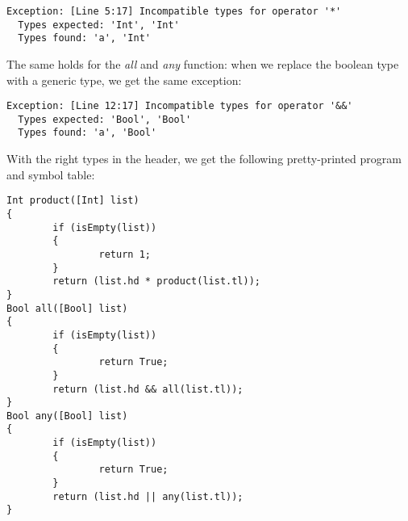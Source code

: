 \documentclass[a4paper]{article}
\begin{document}
\begin{verbatim}
Exception: [Line 5:17] Incompatible types for operator '*'
  Types expected: 'Int', 'Int'
  Types found: 'a', 'Int'
\end{verbatim}
The same holds for the \emph{all} and \emph{any} function: when we replace the boolean type with a generic type, we get the same exception: 
\begin{verbatim}
Exception: [Line 12:17] Incompatible types for operator '&&'
  Types expected: 'Bool', 'Bool'
  Types found: 'a', 'Bool'
\end{verbatim}
With the right types in the header, we get the following pretty-printed program and symbol table:
\begin{verbatim}
Int product([Int] list)
{
        if (isEmpty(list))
        {
                return 1;
        }
        return (list.hd * product(list.tl));
}
Bool all([Bool] list)
{
        if (isEmpty(list))
        {
                return True;
        }
        return (list.hd && all(list.tl));
}
Bool any([Bool] list)
{
        if (isEmpty(list))
        {
                return True;
        }
        return (list.hd || any(list.tl));
}


\end{verbatim}
\end{document}
